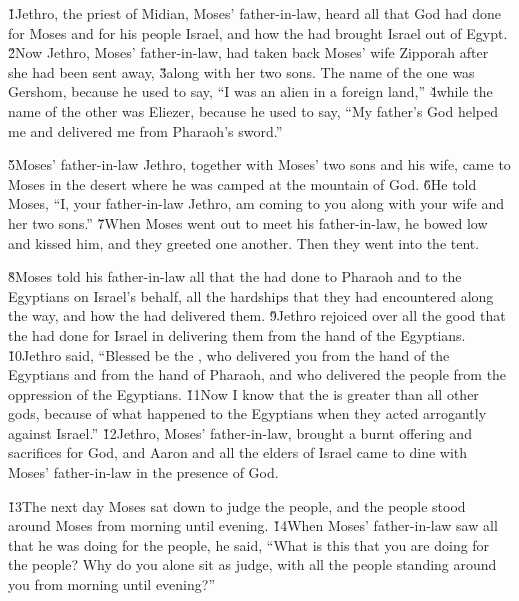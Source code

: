 \v{1}Jethro, the priest of Midian, Moses' father-in-law, heard all that God had done for Moses and for his people Israel, and how the  had brought Israel out of Egypt. \v{2}Now Jethro, Moses' father-in-law, had taken back Moses' wife Zipporah after she had been sent away, \v{3}along with her two sons. The name of the one was Gershom, because he used to say, ``I was an alien in a foreign land,'' \v{4}while the name of the other was Eliezer, because he used to say, ``My father's God helped me and delivered me from Pharaoh's sword.''

\v{5}Moses' father-in-law Jethro, together with Moses' two sons and his wife, came to Moses in the desert where he was camped at the mountain of God. \v{6}He told Moses, ``I, your father-in-law Jethro, am coming to you along with your wife and her two sons.'' \v{7}When Moses went out to meet his father-in-law, he bowed low and kissed him, and they greeted one another. Then they went into the tent.

\v{8}Moses told his father-in-law all that the  had done to Pharaoh and to the Egyptians on Israel's behalf, all the hardships that they had encountered along the way, and how the  had delivered them. \v{9}Jethro rejoiced over all the good that the  had done for Israel in delivering them from the hand of the Egyptians. \v{10}Jethro said, ``Blessed be the , who delivered you from the hand of the Egyptians and from the hand of Pharaoh, and who delivered the people from the oppression of the Egyptians. \v{11}Now I know that the  is greater than all other gods, because of what happened to the Egyptians when they acted arrogantly against Israel.'' \v{12}Jethro, Moses' father-in-law, brought a burnt offering and sacrifices for God, and Aaron and all the elders of Israel came to dine with Moses' father-in-law in the presence of God.

\v{13}The next day Moses sat down to judge the people, and the people stood around Moses from morning until evening. \v{14}When Moses' father-in-law saw all that he was doing for the people, he said, ``What is this that you are doing for the people? Why do you alone sit as judge, with all the people standing around you from morning until evening?''

